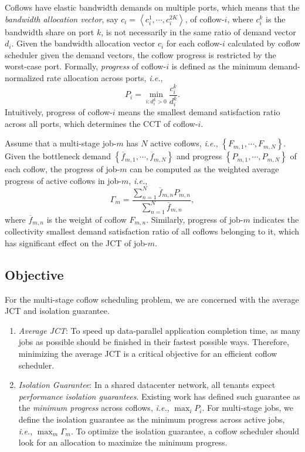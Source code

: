 \documentclass[10pt,journal,compsoc]{IEEEtran}
\begin{document}
Coflows have elastic bandwidth demands on multiple ports, which means that the \emph{bandwidth allocation vector}, say $c_i=\left\langle c_i^1,\cdots,c_i^{2K}\right\rangle$, of coflow-$i$, where $c_i^k$ is the bandwidth share on port $k$, is not necessarily in the same ratio of demand vector $d_i$.
%
Given the bandwidth allocation vector $c_i$ for each coflow-$i$ calculated by coflow scheduler given the demand vectors, the coflow progress is restricted by the worst-case port.
%
Formally, \emph{progress} of coflow-$i$ is defined as the minimum demand-normalized rate allocation across ports, \emph{i.e.},
 \begin{equation}
 	P_i = \min\limits_{i:d_i^k>0}\frac{c_i^k}{d_i^k}.
 \end{equation}
 Intuitively, progress of coflow-$i$ means the smallest demand satisfaction ratio across all ports, which determines the CCT of coflow-$i$.

Assume that a multi-stage job-$m$ has $N$ active coflows, \emph{i.e.}, $\left\{F_{m,1},\cdots,F_{m,N}\right\}$.
%
Given the bottleneck demand $\left\{\overline{f}_{m,1},\cdots,\overline{f}_{m,N}\right\}$ and progress $\left\{P_{m,1},\cdots,P_{m,N}\right\}$ of each coflow, the progress of job-$m$ can be computed as the weighted average progress of active coflows in job-$m$, \emph{i.e.},
\begin{equation}
	\Gamma_m = \frac{\sum_{n=1}^N \overline{f}_{m,n}P_{m,n}}{\sum_{n=1}^N \overline{f}_{m,n}},
\end{equation}
where $\overline{f}_{m,n}$ is the weight of coflow $F_{m,n}$.
%
Similarly, progress of job-$m$ indicates the collectivity smallest demand satisfaction ratio of all coflows belonging to it, which has significant effect on the JCT of job-$m$.

\subsection{Objective}
For the multi-stage coflow  scheduling problem, we are concerned with the average JCT and isolation guarantee.

\begin{enumerate}
	\item \emph{Average JCT}: To speed up data-parallel application completion time, as many jobs as possible should be finished in their fastest possible ways. Therefore, minimizing the average JCT is a critical objective for an efficient coflow scheduler.
	\item \emph{Isolation Guarantee}: In a shared datacenter network, all tenants expect \emph{performance isolation guarantees}. Existing work has defined such guarantee as the \emph{minimum progress} across coflows\cite{HUG}, \emph{i.e.}, $\max_i P_i$. For multi-stage jobs, we define the isolation guarantee as the minimum progress across active jobs, \emph{i.e.}, $\max_m \Gamma_m$. To optimize the isolation guarantee, a coflow scheduler should look for an allocation to maximize the minimum progress.
\end{enumerate}
\end{document}
